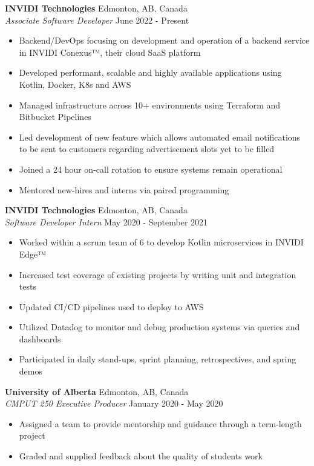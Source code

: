 \documentclass[a4paper]{article}
\begin{document}
\textbf{INVIDI Technologies} \hfill Edmonton, AB, Canada\\
\textit{Associate Software Developer} \hfill June 2022 - Present\\
\vspace{-1mm}
\begin{itemize} \itemsep 1pt
	\item Backend/DevOps focusing on development and operation of a backend service in INVIDI Conexus™, their cloud SaaS platform
	\item Developed performant, scalable and highly available applications using Kotlin, Docker, K8s and AWS
    \item Managed infrastructure across 10+ environments using Terraform and Bitbucket Pipelines
	\item Led development of new feature which allows automated email notifications to be sent to customers regarding advertisement slots yet to be filled
	\item Joined a 24 hour on-call rotation to ensure systems remain operational
    \item Mentored new-hires and interns via paired programming
\end{itemize}
\textbf{INVIDI Technologies} \hfill Edmonton, AB, Canada\\
\textit{Software Developer Intern} \hfill May 2020 - September 2021\\
\vspace{-1mm}
\begin{itemize} \itemsep 1pt
	\item Worked within a scrum team of 6 to develop Kotlin microservices in INVIDI Edge™
	\item Increased test coverage of existing projects by writing unit and integration tests
	\item Updated CI/CD pipelines used to deploy to AWS
	\item Utilized Datadog to monitor and debug production systems via queries and dashboards
	\item Participated in daily stand-ups, sprint planning, retrospectives, and spring demos
\end{itemize}
\textbf{University of Alberta} \hfill Edmonton, AB, Canada\\
\textit{CMPUT 250 Executive Producer} \hfill January 2020 - May 2020\\
\vspace{-1mm}
\begin{itemize} \itemsep 1pt
    \item Assigned a team to provide mentorship and guidance through a term-length project
	\item Graded and supplied feedback about the quality of student\textquotesingle{}s work
\end{itemize}
\end{document}
